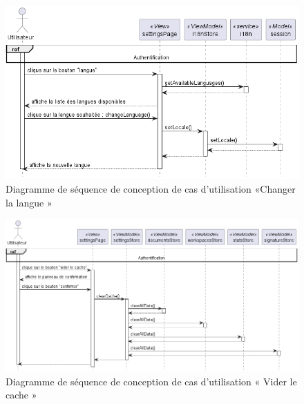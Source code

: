 \begin{figure}[H]
  \centering
  \includegraphics[width=1\textwidth]{out/diagrams/sprint6/sequence_change_language/sequence_change_language}
  \caption{Diagramme de séquence de conception de cas d'utilisation «Changer la langue »}
  \label{fig:conception_sequence_change_language}
\end{figure}

\begin{figure}[H]
  \centering
  \includegraphics[width=1\textwidth]{out/diagrams/sprint6/sequence_clear_cache/sequence_clear_cache}
  \caption{Diagramme de séquence de conception de cas d'utilisation «  Vider le cache »}
  \label{fig:conception_sequence_clear_cache}
\end{figure}

